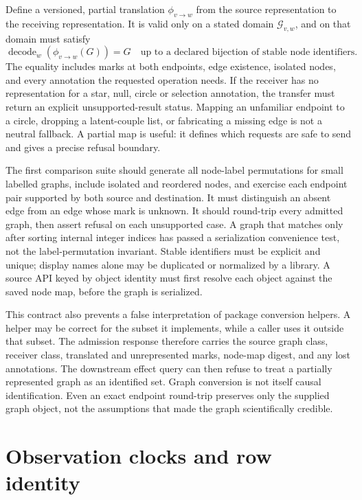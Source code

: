 Define a versioned, partial translation $\phi_{v\to w}$ from the source
representation to the receiving representation. It is valid only on a stated
domain $\mathcal G_{v,w}$, and on that domain must satisfy
\begin{equation}
  \operatorname{decode}_w\!\left(\phi_{v\to w}(G)\right)=G
  \quad\text{up to a declared bijection of stable node identifiers.}
  \label{exec17:s9-round-trip}
\end{equation}
The equality includes marks at both endpoints, edge existence, isolated nodes,
and every annotation the requested operation needs. If the receiver has no
representation for a star, null, circle or selection annotation, the transfer
must return an explicit unsupported-result status. Mapping an unfamiliar
endpoint to a circle, dropping a latent-couple list, or fabricating a missing
edge is not a neutral fallback. A partial map is useful: it defines which
requests are safe to send and gives a precise refusal boundary.

The first comparison suite should generate all node-label permutations for
small labelled graphs, include isolated and reordered nodes, and exercise each
endpoint pair supported by both source and destination. It must distinguish
an absent edge from an edge whose mark is unknown. It should round-trip every
admitted graph, then assert refusal on each unsupported case. A graph that
matches only after sorting internal integer indices has passed a serialization
convenience test, not the label-permutation invariant. Stable identifiers must
be explicit and unique; display names alone may be duplicated or normalized
by a library. A source API keyed by object identity must first resolve each
object against the saved node map, before the graph is serialized.

This contract also prevents a false interpretation of package conversion
helpers. A helper may be correct for the subset it implements, while a caller
uses it outside that subset. The admission response therefore carries the
source graph class, receiver class, translated and unrepresented marks,
node-map digest, and any lost annotations. The downstream effect query can
then refuse to treat a partially represented graph as an identified set.
Graph conversion is not itself causal identification. Even an exact endpoint
round-trip preserves only the supplied graph object, not the assumptions that
made the graph scientifically credible.

\section{Observation clocks and row identity}

